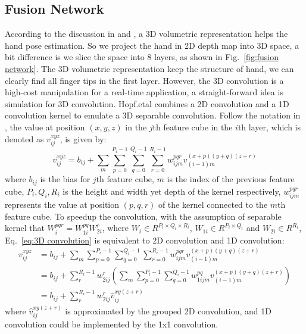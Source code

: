 \documentclass[journal,comsoc]{IEEEtran}
\begin{document}
\subsection{Fusion Network}\label{sec:fusion network}
According to the discussion in \cite{supancic2015depth} and \cite{deng2017hand3d}, a 3D volumetric representation helps the hand pose estimation.
So we project the hand in 2D depth map into 3D space, a bit difference is we slice the space into 8 layers, as shown in Fig.~\ref{fig:fusion network}.
The 3D volumetric representation keep the structure of hand, we can clearly find all finger tips in the first layer. However, the 3D convolution
is a high-cost manipulation for a real-time application, a straight-forward idea is simulation for 3D convolution. Hopf.etal\cite{hopf1999accelerating}
combines a 2D convolution and a 1D convolution kernel to emulate a 3D separable convolution. Follow the notation in \cite{ji20133d}, the value at position $(x,y,z)$
in the $j$th feature cube in the $i$th layer, which is denoted as $v_{ij}^{xyz}$, is given by:
\begin{equation}\label{eq:3D convolution}
v_{ij}^{xyz}=b_{ij} + \sum_{m}\sum_{p=0}^{P_i-1}\sum_{q=0}^{Q_i-1}\sum_{r=0}^{R_i-1} w_{ijm}^{pqr} v_{(i-1)m}^{(x+p)(y+q)(z+r)}
\end{equation}
where $b_{ij}$ is the bias for $j$th feature cube, $m$ is the index of the previous feature cube, $P_i, Q_i, R_i$ is the height and width yet depth of the kernel respectively,
$w_{ijm}^{pqr}$ represents the value at position $(p, q, r)$ of the kernel connected to the $m$th feature cube. To speedup the convolution,
with the assumption of separable kernel that $W^{pqr}_i = W^{pq}_{1i} W^{r}_{2i}$, where $W_i \in R^{P_i \times Q_i \times R_i}$, $W_{1i} \in R^{P_i \times Q_i}$
and $W_{2i} \in R^{R_i}$, Eq.~\ref{eq:3D convolution} is equivalent to 2D convolution and 1D convolution:
\begin{equation}\label{eq:3D to 2D and 1D}
\begin{aligned}
v_{ij}^{xyz}
&=b_{ij} + \sum_{m}\sum_{p=0}^{P_i-1}\sum_{q=0}^{Q_i-1}\sum_{r=0}^{R_i-1} w_{ijm}^{pqr} v_{(i-1)m}^{(x+p)(y+q)(z+r)} \\
&=b_{ij} + \sum_{r}^{R_i-1}w_{2ij}^{r}(\sum_{m}\sum_{p=0}^{P_i-1}\sum_{q=0}^{Q_i-1} w_{1ijm}^{pq} v_{(i-1)m}^{(x+p)(y+q)(z+r)}) \\
&=b_{ij} + \sum_{r}^{R_i-1}w_{2ij}^{r} \hat{v}_{ij}^{xy(z+r)}
\end{aligned}
\end{equation}
where $\hat{v}_{ij}^{xy(z+r)}$ is approximated by the grouped 2D convolution, and 1D convolution could be implemented by the 1x1 convolution.
\end{document}
